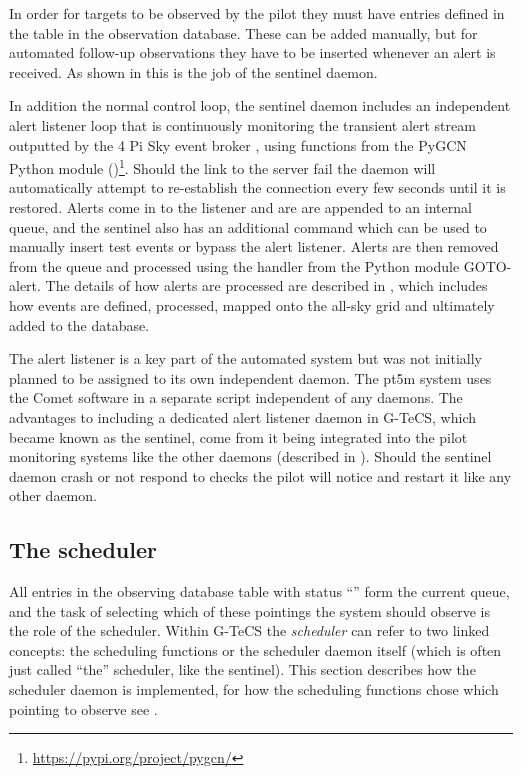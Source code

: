 \begin{colsection}
\begin{colsection}
In order for targets to be observed by the pilot they must have entries defined in the  table in the observation database. These can be added manually, but for automated follow-up observations they have to be inserted whenever an alert is received. As shown in  this is the job of the sentinel daemon.

In addition the normal control loop, the sentinel daemon includes an independent alert listener loop that is continuously monitoring the transient alert stream outputted by the 4 Pi Sky event broker \citep{4pisky}, using functions from the PyGCN Python module ()\footnote{\url{https://pypi.org/project/pygcn/}}. Should the link to the server fail the daemon will automatically attempt to re-establish the connection every few seconds until it is restored. Alerts come in to the listener and are are appended to an internal queue, and the sentinel also has an additional  command which can be used to manually insert test events or bypass the alert listener. Alerts are then removed from the queue and processed using the handler from the Python module GOTO-alert. The details of how alerts are processed are described in , which includes how events are defined, processed, mapped onto the all-sky grid and ultimately added to the database.

\newpage

The alert listener is a key part of the automated system but was not initially planned to be assigned to its own independent daemon. The \gls{pt5m} system uses the Comet software \citep{comet} in a separate script independent of any daemons. The advantages to including a dedicated alert listener daemon in G-TeCS, which became known as the sentinel, come from it being integrated into the pilot monitoring systems like the other daemons (described in ). Should the sentinel daemon crash or not respond to checks the pilot will notice and restart it like any other daemon.

\end{colsection}


\subsection{The scheduler}
\label{sec:scheduler}
\begin{colsection}

All entries in the observing database  table with status ``'' form the current queue, and the task of selecting which of these pointings the system should observe is the role of the scheduler. Within G-TeCS the \emph{scheduler} can refer to two linked concepts: the scheduling functions or the scheduler daemon itself (which is often just called ``the'' scheduler, like the sentinel). This section describes how the scheduler daemon is implemented, for how the scheduling functions chose which pointing to observe see .


\end{colsection}
\end{colsection}
